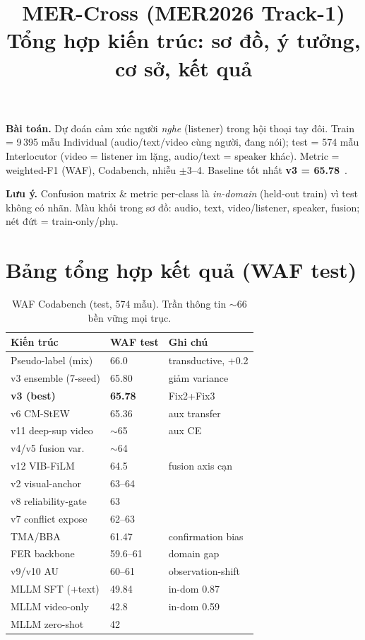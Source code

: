 \documentclass[10pt]{article}
\title{\textbf{MER-Cross (MER2026 Track-1)\\ Tổng hợp kiến trúc: sơ đồ, ý tưởng, cơ sở, kết quả}}
\author{}\date{}
\begin{document}
\maketitle
\noindent\textbf{Bài toán.} Dự đoán cảm xúc người \emph{nghe} (listener) trong hội thoại tay đôi.
Train = 9\,395 mẫu Individual (audio/text/video cùng người, đang nói); test = 574 mẫu Interlocutor
(video = listener im lặng, audio/text = speaker khác). Metric = weighted-F1 (WAF), Codabench, nhiễu $\pm3$--4.
Baseline tốt nhất \textbf{v3 = 65.78}~\cite{mer2026}.

\medskip\noindent\textbf{Lưu ý.} Confusion matrix \& metric per-class là \emph{in-domain} (held-out train)
vì test không có nhãn. Màu khối trong sơ đồ: \textcolor{audiol}{audio},
\textcolor{textl}{text}, \textcolor{videol}{video/listener}, \textcolor{spkl}{speaker},
\textcolor{fusel}{fusion}; nét đứt = train-only/phụ.

\section*{Bảng tổng hợp kết quả (WAF test)}
\begin{table}[H]\centering\footnotesize
\begin{tabular}{lll}\toprule
\textbf{Kiến trúc} & \textbf{WAF test} & \textbf{Ghi chú} \\ \midrule
Pseudo-label (mix) & 66.0 & transductive, +0.2 \\
v3 ensemble (7-seed) & 65.80 & giảm variance \\
\textbf{v3 (best)} & \textbf{65.78} & Fix2+Fix3 \\
v6 CM-StEW & 65.36 & aux transfer \\
v11 deep-sup video & $\sim$65 & aux CE \\
v4/v5 fusion var. & $\sim$64 & \\
v12 VIB-FiLM & 64.5 & fusion axis cạn \\
v2 visual-anchor & 63--64 & \\
v8 reliability-gate & 63 & \\
v7 conflict expose & 62--63 & \\
TMA/BBA & 61.47 & confirmation bias \\
FER backbone & 59.6--61 & domain gap \\
v9/v10 AU & 60--61 & observation-shift \\
MLLM SFT (+text) & 49.84 & in-dom 0.87 \\
MLLM video-only & 42.8 & in-dom 0.59 \\
MLLM zero-shot & 42 & \\
\bottomrule\end{tabular}
\caption{WAF Codabench (test, 574 mẫu). Trần thông tin $\sim$66 bền vững mọi trục.}
\end{table}
\end{document}
